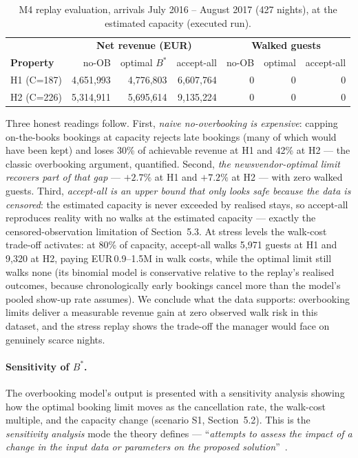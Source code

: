 \begin{table}[H]
\centering
\caption{M4 replay evaluation, arrivals July 2016 -- August 2017 (427 nights), at the estimated capacity (executed run).}
\label{tab:replay}
\begin{tabular}{@{}lrrrrrr@{}}
\toprule
 & \multicolumn{3}{c}{\textbf{Net revenue (EUR)}} & \multicolumn{3}{c}{\textbf{Walked guests}} \\
\textbf{Property} & no-OB & optimal $B^{*}$ & accept-all & no-OB & optimal & accept-all \\
\midrule
H1 (C=187) & 4{,}651{,}993 & 4{,}776{,}803 & 6{,}607{,}764 & 0 & 0 & 0 \\
H2 (C=226) & 5{,}314{,}911 & 5{,}695{,}614 & 9{,}135{,}224 & 0 & 0 & 0 \\
\bottomrule
\end{tabular}
\end{table}

Three honest readings follow. First, \emph{naive no-overbooking is expensive}: capping on-the-books bookings at capacity rejects late bookings (many of which would have been kept) and loses 30\% of achievable revenue at H1 and 42\% at H2 --- the classic overbooking argument, quantified. Second, \emph{the newsvendor-optimal limit recovers part of that gap} --- $+2.7\%$ at H1 and $+7.2\%$ at H2 --- with zero walked guests. Third, \emph{accept-all is an upper bound that only looks safe because the data is censored}: the estimated capacity is never exceeded by realised stays, so accept-all reproduces reality with no walks at the estimated capacity --- exactly the censored-observation limitation of Section~5.3. At stress levels the walk-cost trade-off activates: at 80\% of capacity, accept-all walks 5{,}971 guests at H1 and 9{,}320 at H2, paying EUR\,0.9--1.5M in walk costs, while the optimal limit still walks none (its binomial model is conservative relative to the replay's realised outcomes, because chronologically early bookings cancel more than the model's pooled show-up rate assumes). We conclude what the data supports: overbooking limits deliver a measurable revenue gain at zero observed walk risk in this dataset, and the stress replay shows the trade-off the manager would face on genuinely scarce nights.

\paragraph{Sensitivity of $B^{*}$.}
The overbooking model's output is presented with a sensitivity analysis showing how the optimal booking limit moves as the cancellation rate, the walk-cost multiple, and the capacity change (scenario S1, Section~5.2). This is the \emph{sensitivity analysis} mode the theory defines --- ``\emph{attempts to assess the impact of a change in the input data or parameters on the proposed solution}''~\cite{turban2011}.
